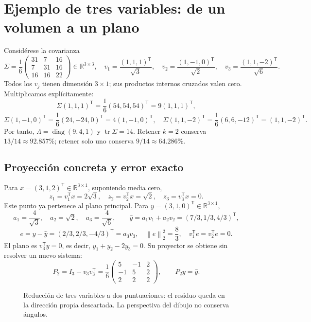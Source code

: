 \documentclass[11pt,a4paper]{article}
\newcommand{\R}{\mathbb R}
\newcommand{\T}{^{\mathsf T}}
\newcommand{\norm}[1]{\left\lVert #1\right\rVert}
\DeclareMathOperator{\tr}{tr}
\DeclareMathOperator{\diag}{diag}
\theoremstyle{definition}
\begin{document}
\section{Ejemplo de tres variables: de un volumen a un plano}
Considérese la covarianza
\[
\Sigma=\frac16\begin{pmatrix}31&7&16\\7&31&16\\16&16&22\end{pmatrix}\in\R^{3\times3},\quad
v_1=\frac{(1,1,1)\T}{\sqrt3},\quad
v_2=\frac{(1,-1,0)\T}{\sqrt2},\quad
v_3=\frac{(1,1,-2)\T}{\sqrt6}.
\]
Todos los $v_j$ tienen dimensión $3\times1$; sus productos internos cruzados valen cero. Multiplicamos explícitamente:
\[
\Sigma(1,1,1)\T=\frac16(54,54,54)\T=9(1,1,1)\T,
\]
\[
\Sigma(1,-1,0)\T=\frac16(24,-24,0)\T=4(1,-1,0)\T,
\quad \Sigma(1,1,-2)\T=\frac16(6,6,-12)\T=(1,1,-2)\T.
\]
Por tanto, $\Lambda=\diag(9,4,1)$ y $\tr\Sigma=14$. Retener $k=2$ conserva $13/14\approx92.857\%$; retener solo uno conserva $9/14\approx64.286\%$.
\subsection{Proyección concreta y error exacto}
Para $x=(3,1,2)\T\in\R^{3\times1}$, suponiendo media cero,
\[
z_1=v_1\T x=2\sqrt3,\quad z_2=v_2\T x=\sqrt2,\quad z_3=v_3\T x=0.
\]
Este punto ya pertenece al plano principal. Para $y=(3,1,0)\T\in\R^{3\times1}$,
\[
a_1=\frac4{\sqrt3},\quad a_2=\sqrt2,\quad a_3=\frac4{\sqrt6},\qquad
\widehat y=a_1v_1+a_2v_2=(7/3,1/3,4/3)\T,
\]
\[
e=y-\widehat y=(2/3,2/3,-4/3)\T=a_3v_3,\quad
\norm e_2^2=\frac83,\quad v_1\T e=v_2\T e=0.
\]
El plano es $v_3\T y=0$, es decir, $y_1+y_2-2y_3=0$. Su proyector se obtiene sin resolver un nuevo sistema:
\[
P_2=I_3-v_3v_3\T=\frac16\begin{pmatrix}5&-1&2\\-1&5&2\\2&2&2\end{pmatrix},\qquad P_2y=\widehat y.
\]
\begin{figure}[H]\centering
{}
\caption{Reducción de tres variables a dos puntuaciones: el residuo queda en la dirección propia descartada. La perspectiva del dibujo no conserva ángulos.}
\end{figure}
\end{document}
